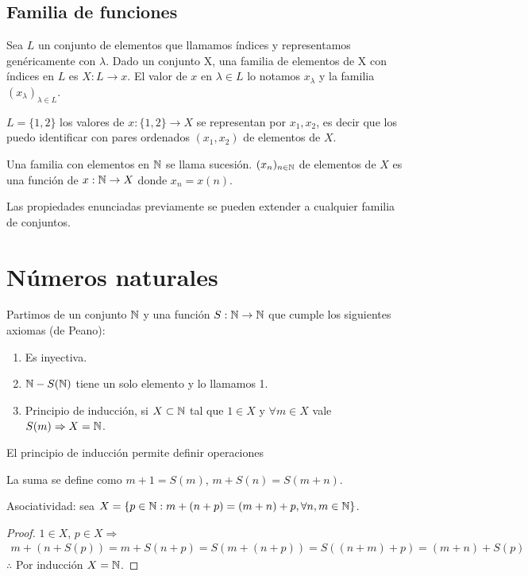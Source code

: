 \subsection{Familia de funciones}

Sea $L$ un conjunto de elementos que llamamos índices y representamos genéricamente con $\lambda$. Dado un conjunto X, una familia de elementos de X con índices en $L$ es $X: L \to x$.
El valor de $x$ en $\lambda \in L$ lo notamos $x_\lambda$ y la familia $(x_\lambda)_{\lambda \in L}$.

\begin{eg}
    $L = \{ 1, 2 \}$ los valores de $x: \{1, 2\} \to X$ se representan por $x_1, x_2$, es decir que los puedo identificar con pares ordenados $(x_1, x_2)$ de elementos de $X$.
\end{eg}

Una familia con elementos en $\mathbb{N}$ se llama sucesión. $(x_n)_{n \in \mathbb{N}}$ de elementos de $X$ es una función de $x: \mathbb{N} \to X$ donde $x_n = x(n)$.

Las propiedades enunciadas previamente se pueden extender a cualquier familia de conjuntos.

\section{Números naturales}

Partimos de un conjunto $\mathbb{N}$ y una función $S: \mathbb{N} \to \mathbb{N}$ que cumple los siguientes axiomas (de Peano):
\begin{enumerate}
    \item Es inyectiva.
    \item $\mathbb{N} - S(\mathbb{N})$ tiene un solo elemento y lo llamamos 1.
    \item Principio de inducción, si $X \subset \mathbb{N}$ tal que $1 \in X$ y $\forall m \in X$ vale $S(m) \Rightarrow X = \mathbb{N}$.
\end{enumerate}

El principio de inducción permite definir operaciones

La suma se define como $m+1 = S(m)$, $m+S(n) = S(m+n)$.

\begin{prop}
    Asociatividad: sea $X = \{ p \in \mathbb{N} : m+(n+p) = (m+n) +p, \forall n,m \in \mathbb{N} \}$.
    \begin{proof}
        $1 \in X$, $p \in X \Rightarrow$ \begin{align*}
            m + (n+S(p)) = m + S(n+p) = S(m +(n+p)) = S((n+m)+p) = (m+n) + S(p)
        \end{align*}
        $\therefore$ Por inducción $X = \mathbb{N}$.
    \end{proof}
\end{prop}


